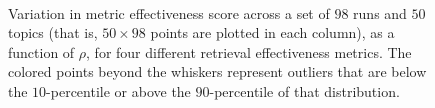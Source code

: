\begin{figure}[t!]
\centering
{}
\\
\caption{Variation in metric effectiveness score across a set of $98$
runs and $50$ topics (that is, $50 \times 98$ points are plotted in
each column), as a function of $\rho$, for four different retrieval
effectiveness metrics.
The colored points beyond the whiskers represent outliers that are
below the $10$-percentile or above the $90$-percentile of that
distribution.
\label{fig-score-variation}}
\end{figure}

